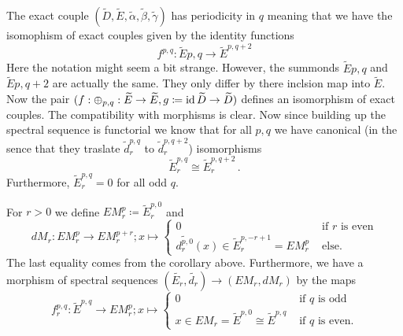 \begin{corollary}[Periodicity in $q$]
	The exact couple $(\widetilde{D},\widetilde{E},\widetilde{\alpha},\widetilde{\beta},\widetilde{\gamma})$ has periodicity in $q$ meaning that we have the isomophism of exact couples given by the identity functions
	\begin{equation*}
		f^{p,q}:\widetilde{E}{p,q}\to \widetilde{E}^{p,q+2}
	\end{equation*}
	Here the notation might seem a bit strange. However, the summonds $\widetilde{E}{p,q}$ and $\widetilde{E}{p,q+2}$ are actually the same. They only differ by there inclsion map into $\widetilde{E}$. Now the pair $(f:\oplus_{p,q}:\widetilde{E}\to \widetilde{E}, g\coloneq \operatorname{\mathrm{id}} \widetilde{D}\to \widetilde{D})$ defines an isomorphism of exact couples. The compatibility with morphisms is clear. Now since building up the spectral sequence is functorial we know that for all $p,q$ we have canonical (in the sence that they traslate $\widetilde{d}_r^{p,q}$ to $\widetilde{d}_r^{p,q+2}$) isomorphisms
	\begin{equation*}
		\widetilde{E}_r^{p,q}\cong \widetilde{E}_{r}^{p,q+2}\,.
	\end{equation*} Furthermore, $\widetilde{E}_r^{p,q}=0$ for all odd $q$.
\end{corollary}

\begin{definition}
	For $r>0$ we define $EM_r^p\coloneq\widetilde{E}^{p,0}_r$ and
	\begin{equation*}
		dM_r:EM_r^p\to EM_r^{p+r}; x\mapsto
		\begin{cases}
			0&\text{ if $r$ is even}\\
			\widetilde{d_r^{p,0}}(x)\in \widetilde{E}_r^{p,-r+1}=EM_r^p&\text{ else. }
		\end{cases}
	\end{equation*} The last equality comes from the corollary above. Furthermore, we have a morphism of spectral sequences $(\widetilde{E_r},\widetilde{d_r})\to (EM_r,dM_r)$ by the maps
	\begin{equation*}
		f_r^{p,q}:\widetilde{E}^{p,q} \to EM^p_r; x\mapsto
		\begin{cases}
			0 & \text{ if $q$ is odd}\\
			x \in EM_r=\widetilde{E}^{p,0}\cong \widetilde{E}^{p,q} &\text{ if $q$ is even.}
		\end{cases}
	\end{equation*}
\end{definition}


